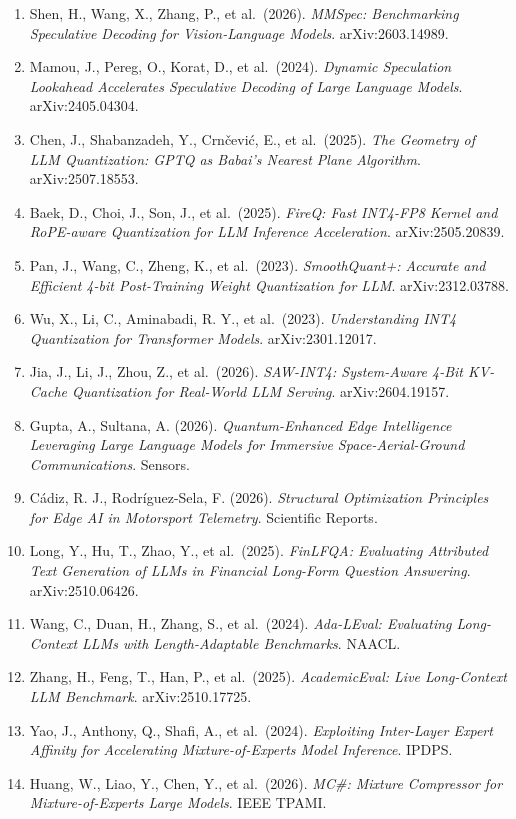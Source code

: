 \begin{enumerate}
\item
  Shen, H., Wang, X., Zhang, P., et al.~(2026). \emph{MMSpec: Benchmarking Speculative Decoding for Vision-Language Models}. arXiv:2603.14989.
\item
  Mamou, J., Pereg, O., Korat, D., et al.~(2024). \emph{Dynamic Speculation Lookahead Accelerates Speculative Decoding of Large Language Models}. arXiv:2405.04304.
\item
  Chen, J., Shabanzadeh, Y., Crnčević, E., et al.~(2025). \emph{The Geometry of LLM Quantization: GPTQ as Babai's Nearest Plane Algorithm}. arXiv:2507.18553.
\item
  Baek, D., Choi, J., Son, J., et al.~(2025). \emph{FireQ: Fast INT4-FP8 Kernel and RoPE-aware Quantization for LLM Inference Acceleration}. arXiv:2505.20839.
\item
  Pan, J., Wang, C., Zheng, K., et al.~(2023). \emph{SmoothQuant+: Accurate and Efficient 4-bit Post-Training Weight Quantization for LLM}. arXiv:2312.03788.
\item
  Wu, X., Li, C., Aminabadi, R. Y., et al.~(2023). \emph{Understanding INT4 Quantization for Transformer Models}. arXiv:2301.12017.
\item
  Jia, J., Li, J., Zhou, Z., et al.~(2026). \emph{SAW-INT4: System-Aware 4-Bit KV-Cache Quantization for Real-World LLM Serving}. arXiv:2604.19157.
\item
  Gupta, A., Sultana, A. (2026). \emph{Quantum-Enhanced Edge Intelligence Leveraging Large Language Models for Immersive Space-Aerial-Ground Communications}. Sensors.
\item
  Cádiz, R. J., Rodríguez-Sela, F. (2026). \emph{Structural Optimization Principles for Edge AI in Motorsport Telemetry}. Scientific Reports.
\item
  Long, Y., Hu, T., Zhao, Y., et al.~(2025). \emph{FinLFQA: Evaluating Attributed Text Generation of LLMs in Financial Long-Form Question Answering}. arXiv:2510.06426.
\item
  Wang, C., Duan, H., Zhang, S., et al.~(2024). \emph{Ada-LEval: Evaluating Long-Context LLMs with Length-Adaptable Benchmarks}. NAACL.
\item
  Zhang, H., Feng, T., Han, P., et al.~(2025). \emph{AcademicEval: Live Long-Context LLM Benchmark}. arXiv:2510.17725.
\item
  Yao, J., Anthony, Q., Shafi, A., et al.~(2024). \emph{Exploiting Inter-Layer Expert Affinity for Accelerating Mixture-of-Experts Model Inference}. IPDPS.
\item
  Huang, W., Liao, Y., Chen, Y., et al.~(2026). \emph{MC\#: Mixture Compressor for Mixture-of-Experts Large Models}. IEEE TPAMI.

\end{enumerate}
